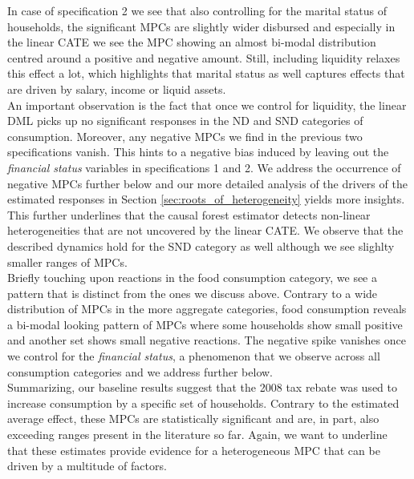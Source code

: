 In case of specification 2 we see that also controlling for the marital status of households, the significant MPCs are slightly wider disbursed and especially in the linear CATE we see the MPC showing an almost bi-modal distribution centred around a positive and negative amount. Still, including liquidity relaxes this effect a lot, which highlights that marital status as well captures effects that are driven by salary, income or liquid assets.\\ 
An important observation is the fact that once we control for liquidity, the linear DML picks up no significant responses in the ND and SND categories of consumption. Moreover, any negative MPCs we find in the previous two specifications vanish. This hints to a negative bias induced by leaving out the \textit{financial status} variables in specifications 1 and 2. We address the occurrence of negative MPCs further below and our more detailed analysis of the drivers of the estimated responses in Section \ref{sec:roots_of_heterogeneity} yields more insights. This further underlines that the causal forest estimator detects non-linear heterogeneities that are not uncovered by the linear CATE. We observe that the described dynamics hold for the SND category as well although we see slighlty smaller ranges of MPCs. \\
Briefly touching upon reactions in the food consumption category, we see a pattern that is distinct from the ones we discuss above. Contrary to a wide distribution of MPCs in the more aggregate categories, food consumption reveals a bi-modal looking pattern of MPCs where some households show small positive and another set shows small negative reactions. The negative spike vanishes once we control for the \textit{financial status}, a phenomenon that we observe across all consumption categories and we address further below. \\
Summarizing, our baseline results suggest that the 2008 tax rebate was used to increase consumption by a specific set of households. Contrary to the estimated average effect, these MPCs are statistically significant and are, in part, also exceeding ranges present in the literature so far. Again, we want to underline that these estimates provide evidence for a heterogeneous MPC that can be driven by a multitude of factors. \\
